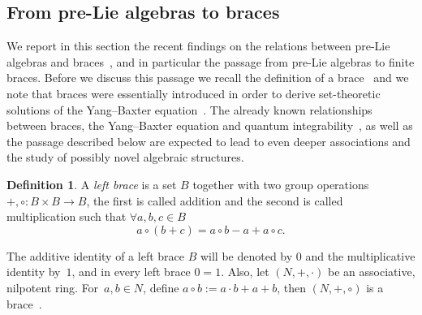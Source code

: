 \documentclass[10pt,a4paper]{amsart}
\numberwithin{equation}{section}
\theoremstyle{definition}
\newtheorem{defn}[thm]{Definition}
\begin{document}
\subsection{From pre-Lie algebras to braces}\label{section2.2}
We report in this section the recent findings on the relations between pre-Lie algebras and braces~\cite{Rump, Smok1, Smok2}, and in particular the passage from pre-Lie algebras to finite braces. Before we discuss this passage we recall the definition of a brace~\cite{Jesp, Rump1} and we note that braces were essentially introduced in order to derive set-theoretic solutions of the Yang--Baxter equation~\cite{Rump1}.
The already known relationships between braces, the Yang--Baxter equation and quantum integrability~\cite{DoiSmo2, DoiSmo1}, as well as the passage described below are expected to lead to even deeper associations and the study of possibly novel algebraic structures.

\begin{defn}
A {\it left brace} is a set $B$ together with two group operations $+,\circ\colon B\times B\to B$,
the first is called addition and the second is called multiplication such that $\forall a,b,c\in B$
\begin{equation*}%
a\circ (b+c)=a\circ b-a+a\circ c.
\end{equation*}
\end{defn}

The additive identity of a left brace $B$ will be denoted by $0$ and the multiplicative identity by~$1$, and in every left brace $0=1$. Also, let $(N,+, \cdot)$ be an {associative, nilpotent} ring. For~${a, b \in N}$, define $a \circ b := a \cdot b + a + b$, then $(N,+, \circ )$ is a brace~\cite{Rump1}.
\end{document}

